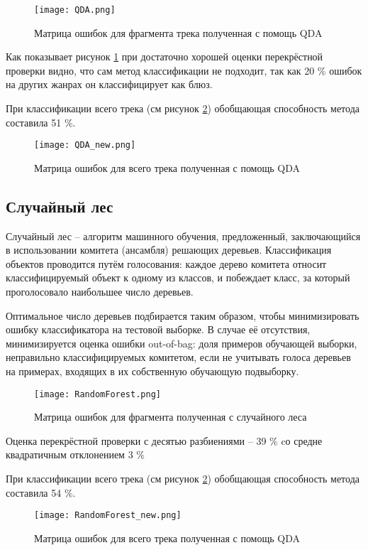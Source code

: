 \begin{figure}[h]
\centering
  \texttt{[image: QDA.png]}
  \caption{Матрица ошибок для фрагмента трека полученная с помощь QDA}
  \label{fig:results:QDA}
\end{figure}

Как показывает рисунок \ref{fig:results:QDA} при достаточно хорошей оценки перекрёстной проверки видно, что сам метод классификации не подходит, так как 20 \% ошибок на других жанрах он классифицирует как блюз. 

При классификации всего трека (см рисунок \ref{fig:results:QDA_new}) обобщающая способность метода составила 51 \%. 
\begin{figure}[h]
\centering
  \texttt{[image: QDA\_new.png]}
  \caption{Матрица ошибок для всего трека полученная с помощь QDA}
  \label{fig:results:QDA_new}
\end{figure}


\subsection{Случайный лес}

Случайный лес -- алгоритм машинного обучения, предложенный, заключающийся в использовании комитета (ансамбля) решающих деревьев. Классификация объектов проводится путём голосования: каждое дерево комитета относит классифицируемый объект к одному из классов, и побеждает класс, за который проголосовало наибольшее число деревьев.

Оптимальное число деревьев подбирается таким образом, чтобы минимизировать ошибку классификатора на тестовой выборке. В случае её отсутствия, минимизируется оценка ошибки out-of-bag: доля примеров обучающей выборки, неправильно классифицируемых комитетом, если не учитывать голоса деревьев на примерах, входящих в их собственную обучающую подвыборку.

\begin{figure}[!h]
\centering
  \texttt{[image: RandomForest.png]}
  \caption{Матрица ошибок для фрагмента полученная с случайного леса}
  \label{fig:results:RandomForest}
\end{figure}

Оценка перекрёстной проверки с десятью разбиениями -- 39 \% cо средне квадратичным отклонением 3 \%

При классификации всего трека (см рисунок \ref{fig:results:QDA_new}) обобщающая способность метода составила 54 \%. 
\begin{figure}[!h]
\centering
  \texttt{[image: RandomForest\_new.png]}
  \caption{Матрица ошибок  для всего трека полученная с помощь QDA}
  \label{fig:results:RandomForest_new}
\end{figure}


